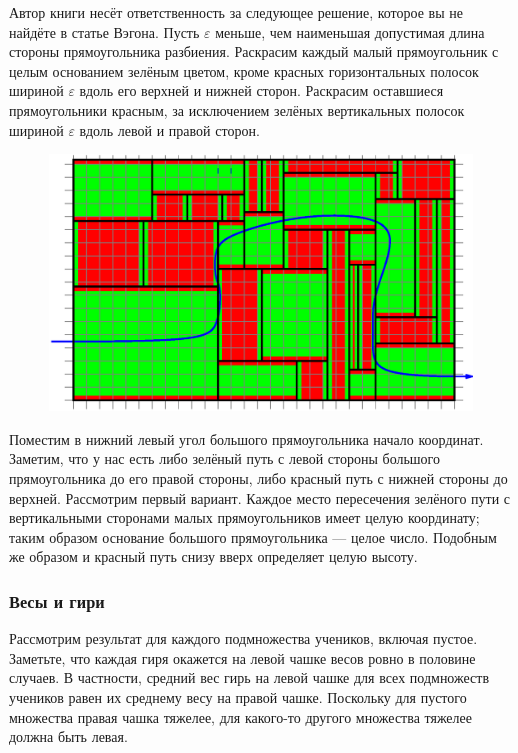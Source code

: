 Автор книги несёт ответственность за следующее решение, которое вы не найдёте в статье Вэгона.
Пусть $\varepsilon$ меньше, чем наименьшая допустимая длина стороны прямоугольника разбиения.
Раскрасим каждый малый прямоугольник с целым основанием зелёным цветом, кроме красных горизонтальных полосок шириной $\varepsilon$ вдоль его верхней и нижней сторон.
Раскрасим оставшиеся прямоугольники красным, за исключением зелёных вертикальных полосок шириной $\varepsilon$ вдоль левой и правой сторон.

\begin{figure}[h!]
\centering
\includegraphics[scale=0.5]{Figs/Insight/green}
\end{figure}

Поместим в нижний левый угол большого прямоугольника начало координат.
Заметим, что у нас есть либо зелёный путь с левой стороны большого прямоугольника до его правой стороны, либо красный путь с нижней стороны до верхней.
Рассмотрим первый вариант.
Каждое место пересечения зелёного пути с вертикальными сторонами малых прямоугольников имеет целую координату; таким образом основание большого прямоугольника --- целое число.
Подобным же образом и красный путь снизу вверх определяет целую высоту.

\subsubsection*{Весы и гири} %

Рассмотрим результат для каждого подмножества учеников, включая пустое.
Заметьте, что каждая гиря окажется на левой чашке весов ровно в половине случаев.
В частности, средний вес гирь на левой чашке для всех подмножеств учеников равен их среднему весу на правой чашке.
Поскольку для пустого множества правая чашка тяжелее, 
для какого-то другого множества тяжелее должна быть левая.\heart


